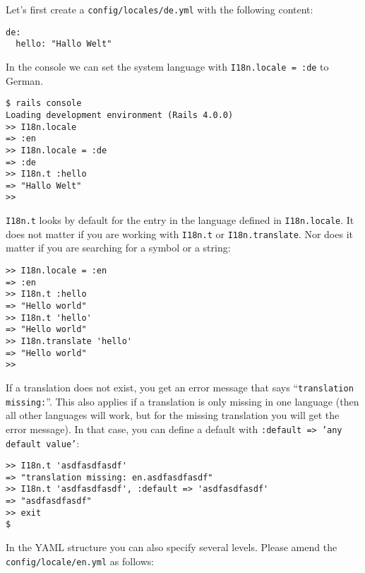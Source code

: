 \documentclass[a4paper]{book}
\begin{document}
Let's first create a \texttt{config/locales/de.yml} with the following content:

\begin{shaded}\begin{verbatim}
de:
  hello: "Hallo Welt"
\end{verbatim}\end{shaded}

In the console we can set the system language with \texttt{I18n.locale = :de} to German.

\begin{shaded}\begin{verbatim}
$ rails console
Loading development environment (Rails 4.0.0)
>> I18n.locale
=> :en
>> I18n.locale = :de
=> :de
>> I18n.t :hello
=> "Hallo Welt"
>>
\end{verbatim}\end{shaded}

\texttt{I18n.t} looks by default for the entry in the language defined in \texttt{I18n.locale}. It does not matter if you are working with \texttt{I18n.t} or \texttt{I18n.translate}. Nor does it matter if you are searching for a symbol or a string:

\begin{shaded}\begin{verbatim}
>> I18n.locale = :en
=> :en
>> I18n.t :hello
=> "Hello world"
>> I18n.t 'hello'
=> "Hello world"
>> I18n.translate 'hello'
=> "Hello world"
>>
\end{verbatim}\end{shaded}

If a translation does not exist, you get an error message that says “\texttt{translation missing:}”. This also applies if a translation is only missing in one language (then all other languages will work, but for the missing translation you will get the error message). In that case, you can define a default with \texttt{:default       =\textgreater{} 'any default value'}:

\begin{shaded}\begin{verbatim}
>> I18n.t 'asdfasdfasdf'
=> "translation missing: en.asdfasdfasdf"
>> I18n.t 'asdfasdfasdf', :default => 'asdfasdfasdf'
=> "asdfasdfasdf"
>> exit
$
\end{verbatim}\end{shaded}

In the YAML structure you can also specify several levels. Please amend the \texttt{config/locale/en.yml} as follows:
\end{document}
